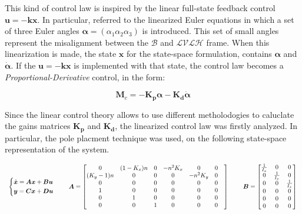 This kind of control law is inspired by the linear full-state feedback control  $\boldsymbol{u} = -\boldsymbol{kx} $. In particular, referred to the linearized Euler equations in which a set of three Euler angles $\boldsymbol{\alpha} = \left(\alpha_1 \alpha_2 \alpha_3 \right)$ is introduced. This set of small angles represent the misalignment between the $\mathcal{B}$ and $\mathcal{LVLH}$ frame. When this linearization is made, the state $\boldsymbol{x}$ for the state-space formulation, contains $\boldsymbol{\alpha}$ and $\dot{\boldsymbol{\alpha}}$. If the $\boldsymbol{u} = -\boldsymbol{kx} $ is implemented with that state, the control law becomes a \textit{Proportional-Derivative} control, in the form:

\begin{equation}
    \boldsymbol{M}_c=-\boldsymbol{K_p}\boldsymbol{\alpha}-\boldsymbol{K_d}\dot{\boldsymbol{\alpha}}
\end{equation}

Since the linear control theory allows to use different metholodogies to caluclate the gains matrices $\boldsymbol{K_p}$ and $\boldsymbol{K_d}$, the linearized control law was firstly analyzed. In particular, the pole placment technique was used, on the following state-space representation of the system. 

\begin{equation}
    \begin{tabular}{c c c c c}
        $\begin{dcases}
            \dot{\boldsymbol{x}} = \boldsymbol{Ax} + \boldsymbol{Bu} \\
            \boldsymbol{y}       = \boldsymbol{Cx} + \boldsymbol{Du} \\
        \end{dcases}$
        & &
        $\boldsymbol{A} =
        \begin{bmatrix}
            0 & (1-K_x)n & 0 & -n^2K_x & 0 & 0 & \\   
            (K_y-1)n & 0 & 0 & 0 & -n^2K_y & 0 & \\   
            0 & 0 & 0 & 0 & 0 & 0 & \\   
            1 & 0 & 0 & 0 & 0 & 0 & \\   
            0 & 1 & 0 & 0 & 0 & 0 & \\   
            0 & 0 & 1 & 0 & 0 & 0 &
        \end{bmatrix}$
        & &
        $\boldsymbol{B}=
        \begin{bmatrix}
            \frac{1}{I_x} & 0 & 0 \\
            0 & \frac{1}{I_x} & 0 \\
            0 & 0 & \frac{1}{I_x} \\
            0 & 0 & 0 \\   
            0 & 0 & 0 \\
            0 & 0 & 0
        \end{bmatrix}$
    \end{tabular}
\end{equation}

